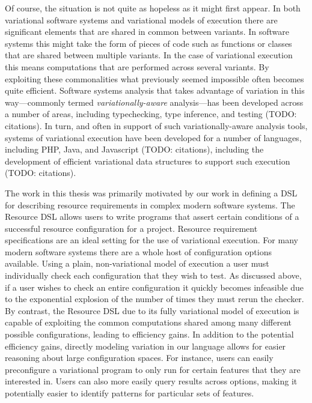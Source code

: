 \documentclass[onehalf,11pt]{beavtex}
\begin{document}
Of course, the situation is not quite as hopeless as it might first appear. In both variational software systems and variational models of execution
there are significant elements that are shared in common between variants. In software systems this might take the form of pieces of code such as functions
or classes that are shared between multiple variants. In the case of variational execution this means computations that are performed across several variants.
By exploiting these commonalities what previously seemed impossible often becomes quite efficient. Software systems analysis that takes advantage of variation
in this way---commonly termed \emph{variationally-aware} analysis---has been developed across a number of areas, including typechecking, type inference, and
testing (TODO: citations). In turn, and often in support of such variationally-aware analysis tools, systems of variational execution have been developed for a number
of languages, including PHP, Java, and Javascript (TODO: citations), including the development of efficient variational data structures to support such execution (TODO: citations).

The work in this thesis was primarily motivated by our work in defining a DSL for describing resource requirements in complex modern software
systems. The Resource DSL allows users to write programs that assert certain conditions of a successful resource configuration for a project.
Resource requirement specifications are an ideal setting for the use of variational execution. For many modern software systems there are a
whole host of configuration options available. Using a plain, non-variational model of execution a user must individually check each configuration that they wish to
test. As discussed above, if a user wishes to check an entire configuration it quickly becomes infeasible due to the exponential explosion of the number of times they must
rerun the checker. By contrast, the Resource DSL due to its fully variational model of execution is capable of exploiting the common computations shared among many different
possible configurations, leading to efficiency gains. In addition to the potential efficiency gains, directly modeling variation in our language allows for easier reasoning about
large configuration spaces. For instance, users can easily preconfigure a variational program to only run for certain features that they are interested in. Users can also more easily
query results across options, making it potentially easier to identify patterns for particular sets of features.
\end{document}
